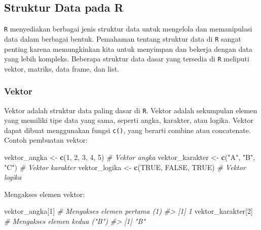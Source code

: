\documentclass[
  oneside]{book}
\newenvironment{Shaded}{\begin{snugshade}}{\end{snugshade}}
\newcommand{\CommentTok}[1]{\textcolor[rgb]{0.56,0.35,0.01}{\textit{#1}}}
\newcommand{\ConstantTok}[1]{\textcolor[rgb]{0.56,0.35,0.01}{#1}}
\newcommand{\DecValTok}[1]{\textcolor[rgb]{0.00,0.00,0.81}{#1}}
\newcommand{\FunctionTok}[1]{\textcolor[rgb]{0.13,0.29,0.53}{\textbf{#1}}}
\newcommand{\NormalTok}[1]{#1}
\newcommand{\OtherTok}[1]{\textcolor[rgb]{0.56,0.35,0.01}{#1}}
\newcommand{\StringTok}[1]{\textcolor[rgb]{0.31,0.60,0.02}{#1}}
\begin{document}
\subsection*{Struktur Data pada R}\label{struktur-data-pada-r}

\texttt{R} menyediakan berbagai jenis struktur data untuk mengelola
dan memanipulasi data dalam berbagai bentuk. Pemahaman tentang struktur
data di \texttt{R} sangat penting karena memungkinkan kita untuk
menyimpan dan bekerja dengan data yang lebih kompleks. Beberapa struktur
data dasar yang tersedia di \texttt{R} meliputi vektor, matriks,
data frame, dan list.

\subsubsection*{Vektor}\label{vektor}

Vektor adalah struktur data paling dasar di \texttt{R}. Vektor
adalah sekumpulan elemen yang memiliki tipe data yang sama, seperti
angka, karakter, atau logika. Vektor dapat dibuat menggunakan fungsi
\texttt{c()}, yang berarti combine atau concatenate. Contoh pembuatan vektor:

\begin{Shaded}
\begin{Highlighting}[]
\NormalTok{vektor\_angka }\OtherTok{\textless{}{-}} \FunctionTok{c}\NormalTok{(}\DecValTok{1}\NormalTok{, }\DecValTok{2}\NormalTok{, }\DecValTok{3}\NormalTok{, }\DecValTok{4}\NormalTok{, }\DecValTok{5}\NormalTok{)      }\CommentTok{\# Vektor angka}
\NormalTok{vektor\_karakter }\OtherTok{\textless{}{-}} \FunctionTok{c}\NormalTok{(}\StringTok{"A"}\NormalTok{, }\StringTok{"B"}\NormalTok{, }\StringTok{"C"}\NormalTok{)   }\CommentTok{\# Vektor karakter}
\NormalTok{vektor\_logika }\OtherTok{\textless{}{-}} \FunctionTok{c}\NormalTok{(}\ConstantTok{TRUE}\NormalTok{, }\ConstantTok{FALSE}\NormalTok{, }\ConstantTok{TRUE}\NormalTok{)  }\CommentTok{\# Vektor logika}
\end{Highlighting}
\end{Shaded}

Mengakses elemen vektor:

\begin{Shaded}
\begin{Highlighting}[]
\NormalTok{vektor\_angka[}\DecValTok{1}\NormalTok{]   }\CommentTok{\# Mengakses elemen pertama (1)}
\CommentTok{\#\textgreater{} [1] 1}
\NormalTok{vektor\_karakter[}\DecValTok{2}\NormalTok{] }\CommentTok{\# Mengakses elemen kedua ("B")}
\CommentTok{\#\textgreater{} [1] "B"}
\end{Highlighting}
\end{Shaded}
\end{document}
